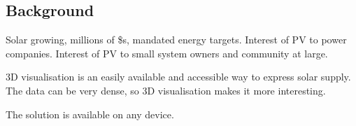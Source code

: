\documentclass[10pt, a4paper]{article}
\begin{document}
\begin{multicols}{2}











\section{Background}

Solar growing, millions of \$s, mandated energy targets.
Interest of PV to power companies.
Interest of PV to small system owners and community at large.

3D visualisation is an easily available and accessible way to express solar supply. The data can be very dense, so 3D visualisation makes it more interesting.

The solution is available on any device.


\end{multicols}
\end{document}

